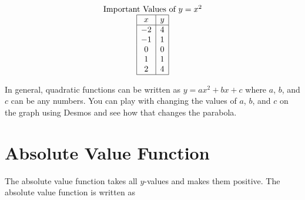 \documentclass[nooutcomes]{ximera}
\begin{document}
\begin{image}
\end{image}

\begin{image}
\end{image}

\[
\begin{array}{c }
\text{Important Values of $y=x^2$}\\
\begin{array}{|c|c|}
 \hline
 x & y\\
 \hline
 -2&4\\
 -1&1\\
 0&0\\
 1&1\\
 2&4\\
 \hline
\end{array}
\end{array}
\]

In general, quadratic functions can be written as $y=ax^2+bx+c$ where $a$, $b$, and $c$ can be any numbers.  You can play with changing the values of $a$, $b$, and $c$ on the graph using Desmos and see how that changes the parabola.  

\begin{center}  
\end{center}


\newpage


\section{Absolute Value Function}
The absolute value function takes all $y$-values and makes them positive.  The absolute value function is written as 

\begin{image}
\end{image}
\end{document}
